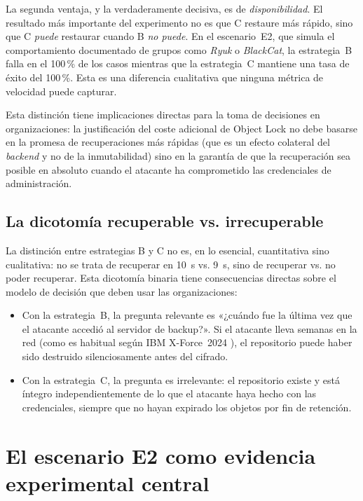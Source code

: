 \documentclass[../main.tex]{subfiles}
\begin{document}
La segunda ventaja, y la verdaderamente decisiva, es de \emph{disponibilidad}. El
resultado más importante del experimento no es que C restaure más rápido, sino que
C \emph{puede} restaurar cuando B \emph{no puede}. En el escenario~E2, que simula el
comportamiento documentado de grupos como \emph{Ryuk} o \emph{BlackCat}, la
estrategia~B falla en el 100\,\% de los casos mientras que la estrategia~C mantiene
una tasa de éxito del 100\,\%. Esta es una diferencia cualitativa que ninguna
métrica de velocidad puede capturar.

Esta distinción tiene implicaciones directas para la toma de decisiones en
organizaciones: la justificación del coste adicional de Object Lock no debe basarse
en la promesa de recuperaciones más rápidas (que es un efecto colateral del
\emph{backend} y no de la inmutabilidad) sino en la garantía de que la
recuperación sea posible en absoluto cuando el atacante ha comprometido las
credenciales de administración.

\subsection{La dicotomía recuperable vs. irrecuperable}

La distinción entre estrategias B y C no es, en lo esencial, cuantitativa sino
cualitativa: no se trata de recuperar en 10~s vs. 9~s, sino de recuperar vs. no
poder recuperar. Esta dicotomía binaria tiene consecuencias directas sobre el
modelo de decisión que deben usar las organizaciones:

\begin{itemize}
  \item Con la estrategia~B, la pregunta relevante es «¿cuándo fue la última vez
  que el atacante accedió al servidor de backup?». Si el atacante lleva semanas
  en la red (como es habitual según IBM X-Force~2024 \cite{ibm2024}), el
  repositorio puede haber sido destruido silenciosamente antes del cifrado.

  \item Con la estrategia~C, la pregunta es irrelevante: el repositorio existe
  y está íntegro independientemente de lo que el atacante haya hecho con las
  credenciales, siempre que no hayan expirado los objetos por fin de retención.
\end{itemize}

\section{El escenario E2 como evidencia experimental central}
\end{document}
